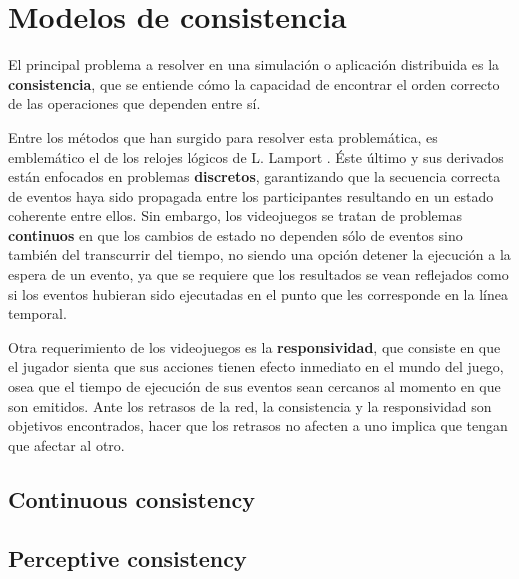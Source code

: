 \section{Modelos de consistencia}


El principal problema a resolver en una simulación o aplicación distribuida es la \textbf{consistencia}, que se entiende cómo la capacidad de encontrar el orden correcto de las operaciones que dependen entre sí.

Entre los métodos que han surgido para resolver esta problemática, es emblemático el de los relojes lógicos de L. Lamport \cite{lamport1978time}. Éste último y sus derivados están enfocados en problemas \textbf{discretos}, garantizando que la secuencia correcta de eventos haya sido propagada entre los participantes resultando en un estado coherente entre ellos. Sin embargo, los videojuegos se tratan de problemas \textbf{continuos} en que los cambios de estado no dependen sólo de eventos sino también del transcurrir del tiempo,
no siendo una opción detener la ejecución a la espera de un evento, ya que se requiere que los resultados se vean reflejados como si los eventos hubieran sido ejecutadas en el punto que les corresponde en la línea temporal\cite{mauve2004local}.

Otra requerimiento de los videojuegos es la \textbf{responsividad}, que consiste en que el jugador sienta que sus acciones tienen efecto inmediato en el mundo del juego, osea que el tiempo de ejecución de sus eventos sean cercanos al momento en que son emitidos. Ante los retrasos de la red, la consistencia y la responsividad son objetivos encontrados, hacer que los retrasos no afecten a uno implica que tengan que afectar al otro.



\subsection{Continuous consistency}


\subsection{Perceptive consistency}

